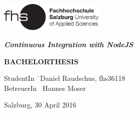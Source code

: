 \begin{titlepage}
\begin{center}

\includegraphics[width=5cm]{images/FHSLogo.pdf}

\vspace*{4cm}

\Large{
	\textit{\textbf{Continuous Integration with NodeJS}}
}

\vspace*{4cm}

\large{
	\textbf{BACHELORTHESIS}
}

\end{center}

\vfill

\begin{tabbing}
StudentIn \= \ Daniel Raudschus, fhs36118 \\
BetreuerIn \> \ Hannes Moser
\end{tabbing}

Salzburg, 30 April 2016

\end{titlepage}
